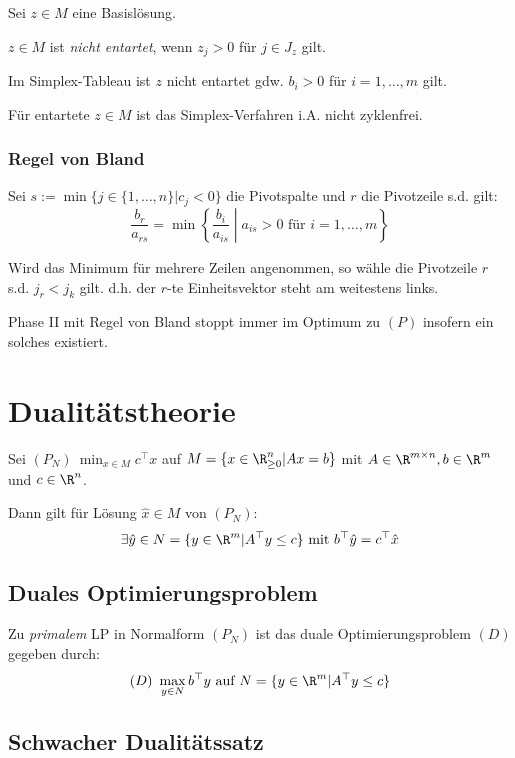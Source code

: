 Sei \(z \in M\) eine Basislösung.

\(z \in M\) ist \emph{nicht entartet}, wenn \(z_j > 0\) für \(j \in J_z\) gilt.

\spacing

Im Simplex-Tableau ist \(z\) nicht entartet gdw. \(b_i > 0\) für \(i=1,\dots,m\) gilt.

Für entartete \(z \in M\) ist das Simplex-Verfahren i.A. nicht zyklenfrei.

\subsubsection*{Regel von Bland}

Sei \(s := \min \{ j \in \{1,\dots,n\} | c_j < 0 \}\) die Pivotspalte und \(r\) die Pivotzeile s.d. gilt:
\[\frac{b_r}{a_{rs}} = \min \left\{ \frac{b_i}{a_{is}} \middle| a_{is} > 0 \text{ für } i=1,\dots,m \right\}\]

Wird das Minimum für mehrere Zeilen angenommen, so wähle die Pivotzeile \(r\) s.d. \(j_r < j_k\) gilt. d.h. der \(r\)-te Einheitsvektor steht am weitestens links.

\spacing

Phase II mit Regel von Bland stoppt immer im Optimum zu \((P)\) insofern ein solches existiert.


\section*{Dualitätstheorie}

Sei \((P_N) \ \min_{x \in M} c^\top x\) auf \(M = \{ x \in \R_{\geq 0}^n | Ax=b \}\) mit \(A \in \R^{m \times n}, b \in \R^m\) und \(c \in \R^n\).

Dann gilt für Lösung \(\hat x \in M\) von \((P_N)\):
\[\exists \hat y \in N = \{ y \in \R^m | A^\top y \leq c \} \text{ mit } b^\top \hat y = c^\top \hat x\]

\subsection*{Duales Optimierungsproblem}

Zu \emph{primalem} LP in Normalform \((P_N)\) ist das duale Optimierungsproblem \((D)\) gegeben durch:
\[(D) \ \max_{y \in N} b^\top y \text{ auf } N = \{y \in \R^m | A^\top y \leq c\}\]

\subsection*{Schwacher Dualitätssatz}

